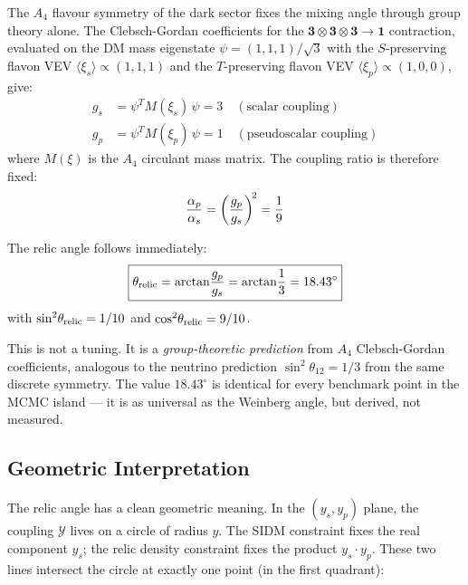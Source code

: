 The $A_4$ flavour symmetry of the dark sector fixes the mixing angle through
group theory alone.  The Clebsch-Gordan coefficients for the
$\mathbf{3}\otimes\mathbf{3}\otimes\mathbf{3}\to\mathbf{1}$ contraction,
evaluated on the DM mass eigenstate $\psi = (1,1,1)/\sqrt{3}$
with the $S$-preserving flavon VEV $\langle\xi_s\rangle \propto (1,1,1)$ and
the $T$-preserving flavon VEV $\langle\xi_p\rangle \propto (1,0,0)$, give:
\begin{align}
  g_s &= \psi^T\!M(\xi_s)\,\psi = 3 \quad (\text{scalar coupling})\\
  g_p &= \psi^T\!M(\xi_p)\,\psi = 1 \quad (\text{pseudoscalar coupling})
\end{align}
where $M(\xi)$ is the $A_4$ circulant mass matrix.
The coupling ratio is therefore fixed:
\begin{equation}
  \frac{\alpha_p}{\alpha_s} = \left(\frac{g_p}{g_s}\right)^{\!2} = \frac{1}{9}
\end{equation}

The relic angle follows immediately:
\begin{equation}
  \boxed{\theta_{\rm relic} = \arctan\!\frac{g_p}{g_s}
         = \arctan\!\frac{1}{3} = 18.43^\circ}
\end{equation}
with $\sin^2\!\theta_{\rm relic} = 1/10$ and $\cos^2\!\theta_{\rm relic} = 9/10$.

This is not a tuning. It is a \emph{group-theoretic prediction} from
$A_4$ Clebsch-Gordan coefficients, analogous to the neutrino prediction
$\sin^2\!\theta_{12} = 1/3$ from the same discrete symmetry.
The value $18.43^\circ$ is identical for every benchmark point in
the MCMC island --- it is as universal as the Weinberg angle, but derived, not measured.

\subsection{Geometric Interpretation}

The relic angle has a clean geometric meaning.
In the $(y_s, y_p)$ plane, the coupling $\mathcal{Y}$ lives on a circle of
radius $y$. The SIDM constraint fixes the real component $y_s$; the relic
density constraint fixes the product $y_s \cdot y_p$. These two lines
intersect the circle at exactly one point (in the first quadrant):

